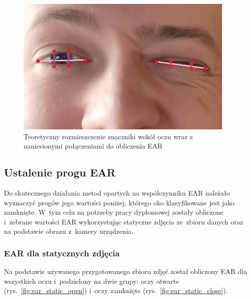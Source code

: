 \begin{figure}[!h]
    \begin{center}
        \includegraphics[scale=0.35]{img/landmark_section/theoretical_eye_landmarks.jpg}
        \caption{Teoretyczny rozmieszczenie znaczniki wokół oczu wraz z naniesionymi połączeniami do obliczenia EAR}
        \label{fig:theoretical_eye_landmarks}
    \end{center}
\end{figure}




\subsection{Ustalenie progu EAR}


Do skutecznego działania metod opartych na współczynniku EAR należało wyznaczyć progów jego wartości poniżej, którego oko klasyfikowane jest jako zamknięte. W~tym celu na potrzeby pracy dyplomowej zostały obliczone i~zebrane wartości EAR wykorzystując statyczne zdjęcia ze~zbioru danych oraz na podstawie obrazu z~kamery urządzenia. 


\subsubsection{EAR dla statycznych zdjęcia}

Na podstawie używanego przygotowanego zbioru zdjęć został obliczony EAR dla wszystkich oczu i~podzielony na dwie grupy: oczy otwarte (rys.~\ref{fig:ear_static_open}) i~oczy zamknięte (rys.~\ref{fig:ear_static_close}). 

\vspace{5mm}


